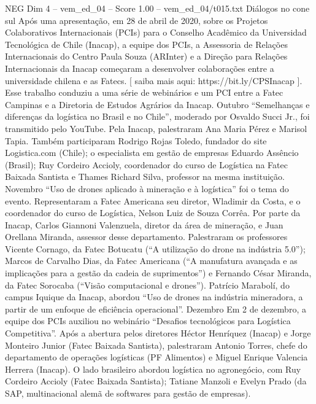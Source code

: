 \begin{textsample}{NEG Dim 4 – vem\_ed\_04 – Score 1.00 – vem\_ed\_04/t015.txt}  \label{ex:f4_neg_109}
Diálogos no cone sul Após uma apresentação, em 28 de abril de 2020, sobre os Projetos Colaborativos Internacionais (PCIs) para o Conselho Acadêmico da Universidad Tecnológica de Chile (Inacap), a equipe dos PCIs, a Assessoria de Relações Internacionais do Centro Paula Souza (ARInter) e a Direção para Relações Internacionais da Inacap começaram a desenvolver colaborações entre a universidade chilena e as Fatecs. [ saiba mais aqui: https://bit.ly/CPSInacap ].
Esse trabalho conduziu a uma série de webinários e um PCI entre a Fatec Campinas e a Diretoria de Estudos Agrários da Inacap.
Outubro “Semelhanças e diferenças da logística no Brasil e no Chile”, moderado por Osvaldo Succi Jr., foi transmitido pelo YouTube.
Pela Inacap, palestraram Ana Maria Pérez e Marisol Tapia.
Também participaram Rodrigo Rojas Toledo, fundador do site Logistica.com (Chile); o especialista em gestão de empresas Eduardo Assêncio (Brasil); Ruy Cordeiro Accioly, coordenador do curso de Logística na Fatec Baixada Santista e Thames Richard Silva, professor na mesma instituição.
Novembro “Uso de drones aplicado à mineração e à logística” foi o tema do evento.
Representaram a Fatec Americana seu diretor, Wladimir da Costa, e o coordenador do curso de Logística, Nelson Luiz de Souza Corrêa.
Por parte da Inacap, Carlos Giannoni Valenzuela, diretor da área de mineração, e Juan Orellana Miranda, assessor desse departamento.
Palestraram os professores Vicente Cornago, da Fatec Botucatu (“A utilização do drone na indústria 5.0”); Marcos de Carvalho Dias, da Fatec Americana (“A manufatura avançada e as implicações para a gestão da cadeia de suprimentos”) e Fernando César Miranda, da Fatec Sorocaba (“Visão computacional e drones”).
Patrício Marabolí, do campus Iquique da Inacap, abordou “Uso de drones na indústria mineradora, a partir de um enfoque de eficiência operacional”.
Dezembro Em 2 de dezembro, a equipe dos PCIs auxiliou no webinário “Desafios tecnológicos para Logística Competitiva”.
Após a abertura pelos diretores Héctor Henríquez (Inacap) e Jorge Monteiro Junior (Fatec Baixada Santista), palestraram Antonio Torres, chefe do departamento de operações logísticas (PF Alimentos) e Miguel Enrique Valencia Herrera (Inacap).
O lado brasileiro abordou logística no agronegócio, com Ruy Cordeiro Accioly (Fatec Baixada Santista); Tatiane Manzoli e Evelyn Prado (da SAP, multinacional alemã de softwares para gestão de empresas).

\end{textsample}
